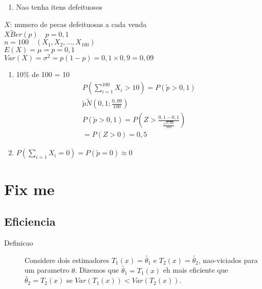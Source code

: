 \begin{description}
\begin{description}
\begin{enumerate}[label=(\alph*)]
    \item Nao tenha itens defeituosos
\end{enumerate}
\item $X$: numero de pecas defeituosas a cada venda\\
  $X \tilde Ber(p) \quad p=0,1$ \\
  $n=100 \quad \left(X_1,X_2,\ldots,X_{100}\right)$\\
  $E(X)=\mu = p= 0,1$\\
  $Var(X)= \sigma^2 = p \left(1-p\right)= 0,1 \times 0,9= 0,09$
 \begin{enumerate}[label=(\alph*)]
   \item 10\% de 100 = 10
     \begin{align*}
       P \left(\sum \limits_{i=1}^{100} X_{i} >10\right) =P \left(\tilde{p}> 0,1\right) \\
       \tilde{p} \tilde N(0,1; \frac{0,09}{100})\\
       P \left( \tilde{p} > 0,1\right) = P \left(Z> \frac{0,1-0,1}{\frac{\sqrt{0,09}}{100}}\right)\\
       =P(Z>0)= 0,5
     \end{align*}
   \item $P \left(\sum \limits_{i=1} X_{i}=0\right)= P(\tilde{p}=0) \approx 0$
 \end{enumerate} 
\end{description} 
\end{description}
\section{Fix me}
\subsection{Eficiencia}
\begin{description}
  \item [Definicao]  Considere dois estimadores $T_1 (x)= \tilde{\theta_1}$
    e $T_2 (x)= \tilde{\theta_2}$, nao-viciados para um parametro $\theta$. Dizemos
    que $\tilde{\theta_1}= T_1 (x)$ eh mais eficiente que $\tilde{\theta_2}= T_2 (x)$ se
    $Var(T_1 (x))< Var(T_2(x))$.
\end{description}
